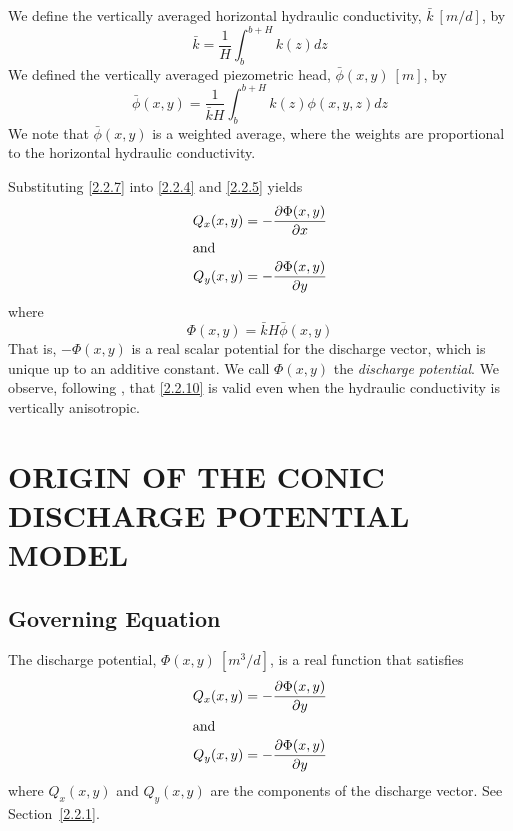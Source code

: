 \documentclass[12pt]{report}
\providecommand{\pderiv}[2]{\frac{\mathinner{\partial#1}}{\mathinner{\partial#2}}}
\begin{document}
We define the vertically averaged horizontal hydraulic conductivity, $\bar{k}~[m/d]$, by
%
\begin{equation}\label{2.2.6}
    \bar{k} = \frac{1}{H} \int_{b}^{b+H} k(z) dz
\end{equation}
%
We defined the vertically averaged piezometric head, $\bar{\phi}(x,y)~[m]$, by
%
\begin{equation}\label{2.2.7}
    \bar{\phi}(x,y) = \frac{1}{\bar{k}H} \int_{b}^{b+H} k(z) \phi(x,y,z) dz
\end{equation}
%
We note that $\bar{\phi}(x,y)$ is a weighted average, where the weights are proportional to the horizontal hydraulic conductivity.

Substituting \eqref{2.2.7} into \eqref{2.2.4} and \eqref{2.2.5} yields
%
\begin{align}
    Q_x(x,y) &= -\pderiv{\Phi(x,y)}{x} \label{2.2.8}\\
        \intertext{and}
    Q_y(x,y) &= -\pderiv{\Phi(x,y)}{y} \label{2.2.9}
\end{align}
%
where
%
\begin{equation}\label{2.2.10}
\boxed{
    \Phi(x,y) = \bar{k} H \bar{\phi}(x,y)
}
\end{equation}
%
That is, $-\Phi(x,y)$ is a real scalar potential for the discharge vector, which is unique up to an additive constant. We call $\Phi(x,y)$ the {\em discharge potential}. We observe, following \citet{Youngs66b}, that \eqref{2.2.10} is valid even when the hydraulic conductivity is vertically anisotropic.



\chapter{ORIGIN OF THE CONIC DISCHARGE POTENTIAL MODEL}\label{3.0.1}
\section{Governing Equation}
The discharge potential, $\Phi(x,y)~[m^3/d]$, is a real function that satisfies
%
\begin{align}
    Q_x(x,y) &= -\pderiv{\Phi(x,y)}{y} \label{3.1.1}\\
        \intertext{and}
    Q_y(x,y) &= -\pderiv{\Phi(x,y)}{y} \label{3.1.2}
\end{align}
%
where $Q_x(x,y)$ and $Q_y(x,y)$ are the components of the discharge vector. See Section~\ref{2.2.1}.
\end{document}
